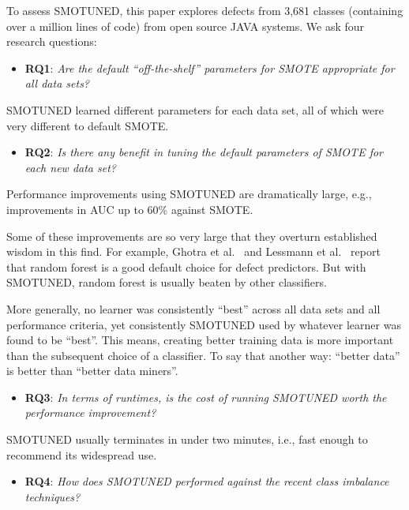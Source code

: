 \documentclass[sigconf,review, anonymous]{acmart}
\newcommand{\bi}{\begin{itemize}[leftmargin=0.4cm]}
\newcommand{\ei}{\end{itemize}}
\theoremstyle{break}
\theoremstyle{break}
\newcommand{\sma}{{\sc SMOTE}}
\newcommand{\smb}{{\sc SMOTUNED}}
\begin{document}
To assess {\smb}, this paper explores defects from  3,681	 classes (containing over a million lines of code) from open source JAVA systems. We ask four research questions: 
 \bi\item
  \textbf{RQ1}:  {\em Are the default ``off-the-shelf'' parameters for {\sma} appropriate for
  all data sets?} 
  \ei
 \begin{lesson}{\smb} learned different parameters for each data set, all of which  were very different to default {\sma}.
 \end{lesson}
  \bi
  \item
  \textbf{RQ2}: {\em   Is  there any benefit in tuning the default parameters of {\sma} for
  each new data set?} 
  \ei
   \begin{lesson}Performance improvements using {\smb} are dramatically large, e.g., improvements in AUC up to 60\% against {\sma}.
 \end{lesson}
Some of these improvements are so very large that they overturn established wisdom in this find.
For example,  Ghotra et al.~\cite{ghotra2015revisiting} and Lessmann et al.~\cite{lessmann2008benchmarking}
 report that   random forest is a  good default choice for  defect predictors.
But with  {\smb}, random forest is usually
beaten by other classifiers. 

More generally, no learner was consistently ``best'' across all data sets and all performance criteria, yet consistently {\smb} used by  whatever  learner was found to be ``best''.  
This means,  creating better training data is more important
than the subsequent choice of a classifier.  To say that another way: ``better data'' is better than ``better data miners''.
 
  
   \bi
  \item
  \textbf{RQ3}: {\em  In terms of runtimes, is the cost of running {\smb} worth the performance improvement?}
  \ei
  
   \begin{lesson}{\smb} usually terminates in under two minutes, i.e.,  fast enough
   to recommend its widespread use.
 \end{lesson}

   \bi
  \item
  \textbf{RQ4}: {\em  How does {\smb} performed against the recent class imbalance techniques?}
  \ei
  
\end{document}
